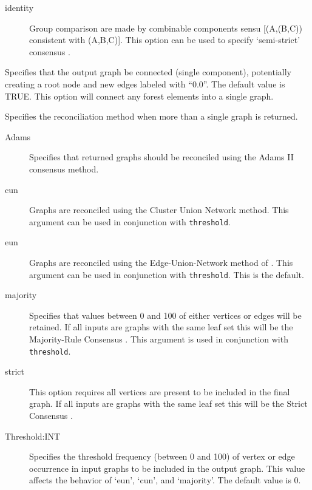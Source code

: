\begin{description}
\begin{description}
\begin{description}
				\item[identity] Group comparison are made by combinable components 
				sensu \cite{Nelson1979} [(A,(B,C)) consistent with (A,B,C)]. This option 
				can be used to specify `semi-strict' consensus \citep{Bremer1990}.
				     
			\end{description}
			
			\item [Connect:BOOL] Specifies that the output graph be connected 
			(single component), potentially creating a root node and new edges labeled 
			with ``0.0''. The default value is TRUE. This option will connect any forest elements
			into a single graph. 
			
			\item [Method:] Specifies the reconciliation method when more than a single
			   graph is returned.
			
			\begin{description}
			
				\item[Adams] Specifies that returned graphs should be reconciled using the 
				Adams II consensus \citep{Adams1972} method.
				
				\item[cun] Graphs are reconciled using the Cluster Union Network 
				\citep{Baroni2005} method. This argument can be used in conjunction with 
				\texttt{threshold}. 
				
				\item[eun] Graphs are reconciled using the Edge-Union-Network method of 
				\citep{MiyagiandWheeler2019}. This argument can be used in conjunction with 
				\texttt{threshold}. This is the default.
				
				\item[majority] Specifies that values between 0 and 100 of either vertices or 
				edges will be retained. If all inputs are graphs with the same leaf set this will 
				be the Majority-Rule Consensus \citep{MargushandMcMorris1981}. This
				argument is used in conjunction with \texttt{threshold}.

				\item[strict] This option requires all vertices are present to be included in the 
				final graph. If all inputs are graphs with the same leaf set this will be the Strict 
				Consensus \citep{Schuhandpolhemus1980}. 
				
				\item [Threshold:INT] Specifies the threshold frequency (between 0 and 100) 
				of vertex or edge occurrence in input graphs to be included in the output graph. 
				This value affects the behavior of `eun', `cun', and `majority'. The 
				default value is $0$.
				

\end{description}
\end{description}
\end{description}
